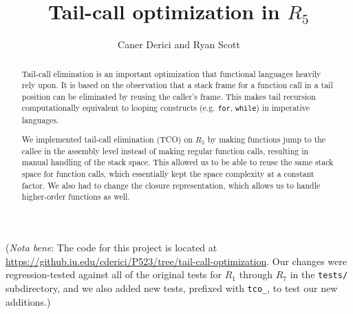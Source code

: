 \documentclass[12pt]{article}
\begin{document}
%
%
%
%
%
%
%
%

\title{Tail-call optimization in $R_5$\vspace{-2ex}}
\author{Caner Derici and Ryan Scott} 
 
\maketitle

(\emph{Nota bene}: The code for this project is located at
\url{https://github.iu.edu/cderici/P523/tree/tail-call-optimization}. Our changes
were regression-tested against all of the original tests for $R_1$ through
$R_7$ in the \verb+tests/+ subdirectory, and we also added new tests, prefixed
with \verb+tco_+, to test our new additions.)

\begin{abstract}
  Tail-call elimination is an important optimization that
  functional languages heavily rely upon. It is based on the
  observation that a stack frame for a function call in a
  tail position can be eliminated by reusing the caller's frame. This
  makes tail recursion computationally equivalent to
  looping constructs (e.g. \verb+for+, \verb+while+) in imperative languages.

  We implemented tail-call elimination (TCO) on $R_5$ by making
  functions jump to the callee in the assembly level instead of making
  regular function calls, resulting in manual handling of the stack
  space. This allowed us to be able to reuse the same stack space for
  function calls, which essentially kept the space complexity at a
  constant factor. We also had to change the closure representation,
  which allows us to handle higher-order functions as well.
\end{abstract}
\end{document}
